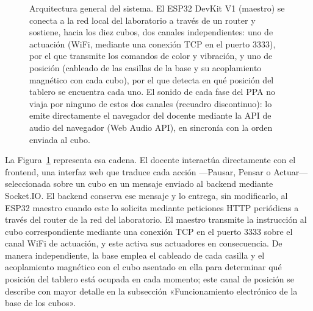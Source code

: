 \documentclass{book}
\begin{document}
\begin{figure}[H]
\begin{tikzpicture}
\end{tikzpicture}
\caption{Arquitectura general del sistema. El ESP32 DevKit V1 (maestro)
se conecta a la red local del laboratorio a través de un router y
sostiene, hacia los diez cubos, dos canales independientes: uno de
actuación (WiFi, mediante una conexión TCP en el puerto 3333), por el
que transmite los comandos de color y vibración, y
uno de posición (cableado de las casillas de la base y su acoplamiento
magnético con cada cubo), por el que detecta en qué posición del
tablero se encuentra cada uno. El sonido de cada fase del PPA no viaja
por ninguno de estos dos canales (recuadro discontinuo): lo emite
directamente el navegador del docente mediante la API de audio del
navegador (Web Audio API), en sincronía con la orden enviada al cubo.}
\label{fig:arquitectura-general}
\end{figure}

La Figura~\ref{fig:arquitectura-general} representa esa cadena. El
docente interactúa directamente con el frontend, una interfaz web que
traduce cada acción —Pausar, Pensar o Actuar— seleccionada sobre un
cubo en un mensaje enviado al backend mediante Socket.IO. El backend
conserva ese mensaje y lo entrega, sin modificarlo, al ESP32 maestro
cuando este lo solicita mediante peticiones HTTP periódicas a través
del router de la red del laboratorio. El maestro transmite la
instrucción al cubo correspondiente mediante una conexión TCP en el
puerto 3333 sobre el canal WiFi de actuación, y este activa sus
actuadores en consecuencia. De manera independiente, la base emplea el
cableado de cada casilla y el acoplamiento magnético con el cubo
asentado en ella para determinar qué posición del tablero está
ocupada en cada momento; este canal de posición se describe con mayor
detalle en la subsección «Funcionamiento electrónico de la base de los
cubos».
\end{document}
